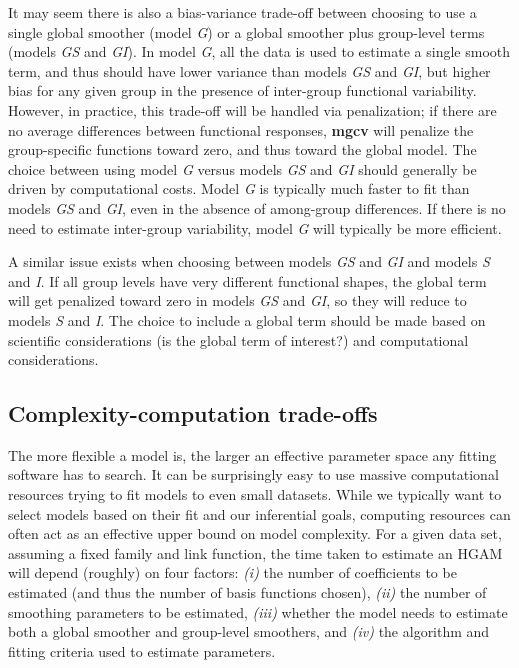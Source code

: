 \documentclass[12pt]{article}
\begin{document}
It may seem there is also a bias-variance trade-off between choosing to
use a single global smoother (model \emph{G}) or a global smoother plus
group-level terms (models \emph{GS} and \emph{GI}). In model \emph{G},
all the data is used to estimate a single smooth term, and thus should
have lower variance than models \emph{GS} and \emph{GI}, but higher bias
for any given group in the presence of inter-group functional
variability. However, in practice, this trade-off will be handled via
penalization; if there are no average differences between functional
responses, \textbf{mgcv} will penalize the group-specific functions
toward zero, and thus toward the global model. The choice between using
model \emph{G} versus models \emph{GS} and \emph{GI} should generally be
driven by computational costs. Model \emph{G} is typically much faster
to fit than models \emph{GS} and \emph{GI}, even in the absence of
among-group differences. If there is no need to estimate inter-group
variability, model \emph{G} will typically be more efficient.

A similar issue exists when choosing between models \emph{GS} and
\emph{GI} and models \emph{S} and \emph{I}. If all group levels have
very different functional shapes, the global term will get penalized
toward zero in models \emph{GS} and \emph{GI}, so they will reduce to
models \emph{S} and \emph{I}. The choice to include a global term should
be made based on scientific considerations (is the global term of
interest?) and computational considerations.

\subsection{Complexity-computation
trade-offs}\label{complexity-computation-trade-offs}

The more flexible a model is, the larger an effective parameter space
any fitting software has to search. It can be surprisingly easy to use
massive computational resources trying to fit models to even small
datasets. While we typically want to select models based on their fit
and our inferential goals, computing resources can often act as an
effective upper bound on model complexity. For a given data set,
assuming a fixed family and link function, the time taken to estimate an
HGAM will depend (roughly) on four factors: \emph{(i)} the number of
coefficients to be estimated (and thus the number of basis functions
chosen), \emph{(ii)} the number of smoothing parameters to be estimated,
\emph{(iii)} whether the model needs to estimate both a global smoother
and group-level smoothers, and \emph{(iv)} the algorithm and fitting
criteria used to estimate parameters.
\end{document}
